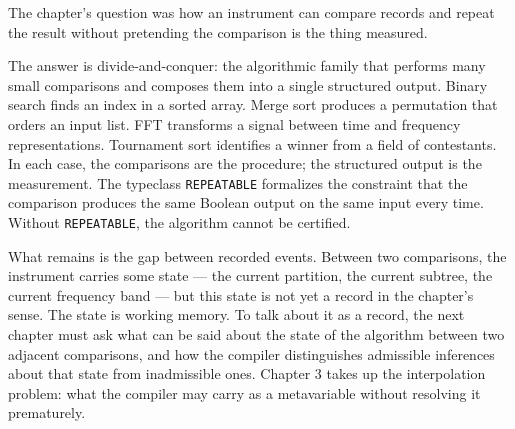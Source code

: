 \begin{bridge}

The chapter's question was how an instrument can compare records and
repeat the result without pretending the comparison is the thing
measured.

The answer is divide-and-conquer: the algorithmic family that performs
many small comparisons and composes them into a single structured
output. Binary search finds an index in a sorted array. Merge sort
produces a permutation that orders an input list. FFT transforms a
signal between time and frequency representations. Tournament sort
identifies a winner from a field of contestants. In each case, the
comparisons are the procedure; the structured output is the
measurement. The typeclass \texttt{REPEATABLE} formalizes the constraint
that the comparison produces the same Boolean output on the same input
every time. Without \texttt{REPEATABLE}, the algorithm cannot be
certified.

What remains is the gap between recorded events. Between two
comparisons, the instrument carries some state --- the current
partition, the current subtree, the current frequency band --- but
this state is not yet a record in the chapter's sense. The state is
working memory. To talk about it as a record, the next chapter must
ask what can be said about the state of the algorithm between two
adjacent comparisons, and how the compiler distinguishes admissible
inferences about that state from inadmissible ones. Chapter 3 takes
up the interpolation problem: what the compiler may carry as a
metavariable without resolving it prematurely.

\end{bridge}

